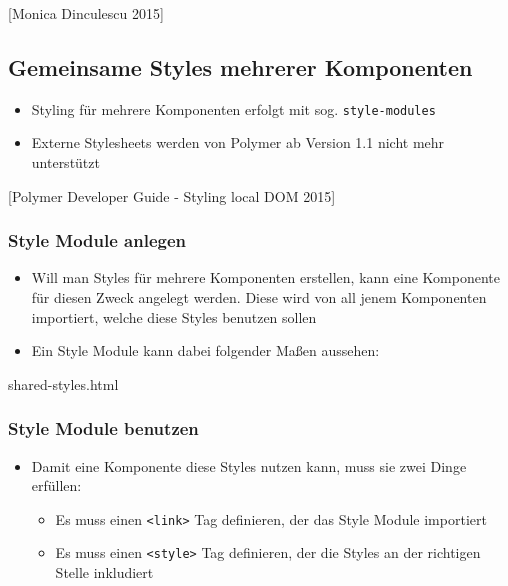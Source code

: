 {[}Monica Dinculescu 2015{]}

\subsection{Gemeinsame Styles mehrerer
Komponenten}\label{gemeinsame-styles-mehrerer-komponenten}

\begin{itemize}
\tightlist
\item
  Styling für mehrere Komponenten erfolgt mit sog.
  \texttt{style-modules}
\item
  Externe Stylesheets werden von Polymer ab Version 1.1 nicht mehr
  unterstützt
\end{itemize}

{[}Polymer Developer Guide - Styling local DOM 2015{]}

\subsubsection{Style Module anlegen}\label{style-module-anlegen}

\begin{itemize}
\tightlist
\item
  Will man Styles für mehrere Komponenten erstellen, kann eine
  Komponente für diesen Zweck angelegt werden. Diese wird von all jenem
  Komponenten importiert, welche diese Styles benutzen sollen
\item
  Ein Style Module kann dabei folgender Maßen aussehen:
\end{itemize}

shared-styles.html

\begin{Shaded}
\begin{Highlighting}[]
\KeywordTok{>}
       \KeywordTok{\{}  \KeywordTok{;} \KeywordTok{\}}
\end{Highlighting}
\end{Shaded}

\subsubsection{Style Module benutzen}\label{style-module-benutzen}

\begin{itemize}
\tightlist
\item
  Damit eine Komponente diese Styles nutzen kann, muss sie zwei Dinge
  erfüllen:

  \begin{itemize}
  \tightlist
  \item
    Es muss einen \texttt{\textless{}link\textgreater{}} Tag definieren,
    der das Style Module importiert
  \item
    Es muss einen \texttt{\textless{}style\textgreater{}} Tag
    definieren, der die Styles an der richtigen Stelle inkludiert
  \end{itemize}
\end{itemize}


